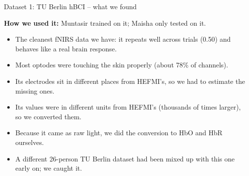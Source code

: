 \documentclass[aspectratio=169,11pt]{beamer}
\begin{document}
\begin{frame}{Dataset 1: TU Berlin hBCI -- what we found}
\begin{slidebox}
\small
\textbf{How we used it:} Muntasir trained on it; Maisha only tested on it.
\begin{itemize}\setlength{\itemsep}{3pt}
  \item The cleanest fNIRS data we have: it repeats well across trials (0.50) and behaves like a real brain response.
  \item Most optodes were touching the skin properly (about 78\% of channels).
  \item Its electrodes sit in different places from HEFMI's, so we had to estimate the missing ones.
  \item Its values were in different units from HEFMI's (thousands of times larger), so we converted them.
  \item Because it came as raw light, we did the conversion to HbO and HbR ourselves.
  \item A different 26-person TU Berlin dataset had been mixed up with this one early on; we caught it.
\end{itemize}
\end{slidebox}
\end{frame}
\end{document}
